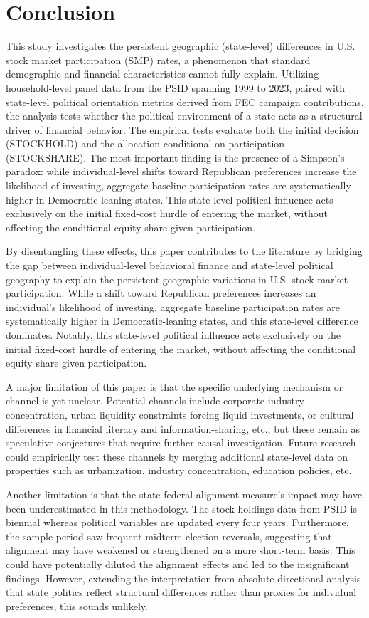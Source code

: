 
\section{Conclusion}

This study investigates the persistent geographic (state-level) differences in U.S. stock market participation (SMP) rates, a phenomenon that standard demographic and financial characteristics cannot fully explain. Utilizing household-level panel data from the PSID spanning 1999 to 2023, paired with state-level political orientation metrics derived from FEC campaign contributions, the analysis tests whether the political environment of a state acts as a structural driver of financial behavior. The empirical tests evaluate both the initial decision (STOCKHOLD) and the allocation conditional on participation (STOCKSHARE). The most important finding is the presence of a Simpson's paradox: while individual-level shifts toward Republican preferences increase the likelihood of investing, aggregate baseline participation rates are systematically higher in Democratic-leaning states. This state-level political influence acts exclusively on the initial fixed-cost hurdle of entering the market, without affecting the conditional equity share given participation. 

By disentangling these effects, this paper contributes to the literature by bridging the gap between individual-level behavioral finance and state-level political geography to explain the persistent geographic variations in U.S. stock market participation. While a shift toward Republican preferences increases an individual's likelihood of investing,  aggregate baseline participation rates are systematically higher in Democratic-leaning states, and this state-level difference dominates. Notably, this state-level political influence acts exclusively on the initial fixed-cost hurdle of entering the market, without affecting the conditional equity share given participation. 

A major limitation of this paper is that the specific underlying mechanism or channel is yet unclear. Potential channels include corporate industry concentration, urban liquidity constraints forcing liquid investments, or cultural differences in financial literacy and information-sharing, etc., but these remain as speculative conjectures that require further causal investigation. Future research could empirically test these channels by merging additional state-level data on properties such as urbanization, industry concentration, education policies, etc. 

Another limitation is that the state-federal alignment measure's impact may have been underestimated in this methodology. The stock holdings data from PSID is biennial whereas political variables are updated every four years. Furthermore, the sample period saw frequent midterm election reversals, suggesting that alignment may have weakened or strengthened on a more short-term basis. This could have potentially diluted the alignment effects and led to the insignificant findings. However, extending the interpretation from absolute directional analysis that state politics reflect structural differences rather than proxies for individual preferences, this sounds unlikely. 